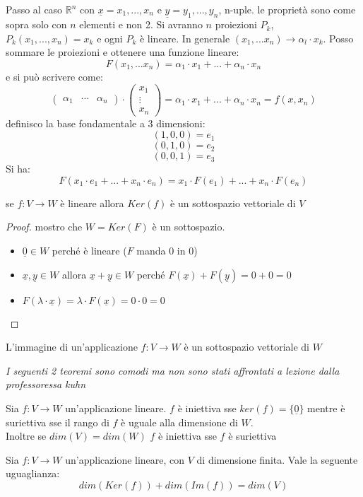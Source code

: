 \documentclass[a4paper,12pt, oneside]{book}
\begin{document}
Passo al caso $\mathbb{R}^n$ con $\underline{x}=x_1,...,x_n$ e $\underline{y}=y_1,...,y_n$, n-uple. le proprietà sono come sopra solo con $n$ elementi e non 2. Si avranno $n$ proiezioni $P_k$, $P_k(x_1,...,x_n)=x_k$ e ogni $P_k$ è lineare. In generale $(x_1,...x_n)\rightarrow\alpha_l\cdot x_k$. Posso sommare le proiezioni e ottenere una funzione lineare:$$F(x_1,...x_n)=\alpha_1\cdot x_1+...+\alpha_n\cdot x_n$$
e si può scrivere come:
$$
\left(\begin{matrix}
\alpha_1 & \cdots & \alpha_n
\end{matrix}\right)\cdot
\left(\begin{matrix}
x_1 \\
\vdots\\
x_n
\end{matrix}\right)=\alpha_1\cdot x_1+...+\alpha_n\cdot x_n=f(x,x_n)
$$
definisco la base fondamentale a 3 dimensioni:
$$(1,0,0)=e_1$$
$$(0,1,0)=e_2$$
$$(0,0,1)=e_3$$
Si ha: $$F(x_1\cdot e_1+...+x_n\cdot e_n)=x_1\cdot F(e_1)+...+x_n\cdot F(e_n)$$
\newpage
\begin{teorema}
se $f:V\rightarrow W$ è lineare allora $Ker(f)$ è un sottospazio vettoriale di $V$
\end{teorema}
\begin{proof}
mostro che $W=Ker(F)$ è un sottospazio.
\begin{itemize}
\item $\underline{0}\in W$ perché è lineare ($F$ manda 0 in 0)
\item $\underline{x},\underline{y}\in W $ allora $\underline{x}+\underline{y}\in W$ perché $F(\underline{x})+F(\underline{y})=0+0=0$
\item $F(\lambda\cdot \underline{x})=\lambda\cdot F(\underline{x})=0\cdot 0=0$
\end{itemize}
\end{proof}
\begin{teorema}
L'immagine di un'applicazione $f:V\rightarrow W$ è un sottospazio vettoriale di $W$
\end{teorema}
\textit{I seguenti 2 teoremi sono comodi ma non sono stati affrontati a lezione dalla professoressa kuhn}
\begin{teorema}
Sia $f:V\rightarrow W$ un'applicazione lineare. $f$ è iniettiva sse $ker(f)=\{\underline{0}\}$ mentre è suriettiva sse il rango di $f$ è uguale alla dimensione di $W$.\\
Inoltre se $dim(V)=dim(W)$ $f$ è iniettiva sse $f$ è suriettiva
\end{teorema}
\begin{teorema}
Sia $f:V\rightarrow W$ un'applicazione lineare, con $V$ di dimensione finita. Vale la seguente uguaglianza:
$$dim(Ker(f))+dim(Im(f))=dim(V)$$
\end{teorema}
\end{document}
